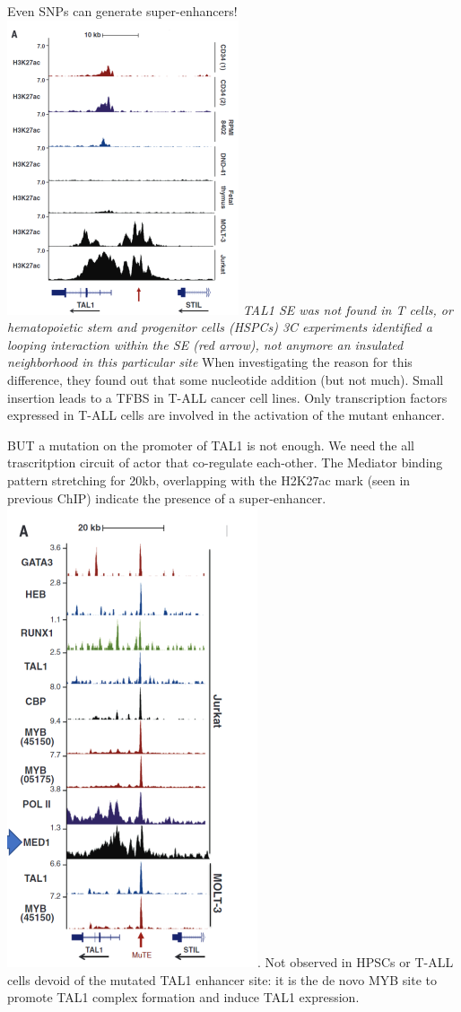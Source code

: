 Even SNPs can generate super-enhancers!
\includegraphics{../_resources/c099d4a9ad4bba13e7839f48fd831265.png}
\emph{TAL1 SE was not found in T cells, or hematopoietic stem and progenitor cells (HSPCs)
3C experiments identified a looping interaction within the SE (red arrow), not anymore an insulated neighborhood in this particular site}
When investigating the reason for this difference, they found out that some nucleotide addition (but not much). Small insertion leads to a TFBS in T-ALL cancer cell lines. Only transcription factors expressed in T-ALL cells are involved in the activation of the mutant enhancer.

BUT a mutation on the promoter of TAL1 is not enough. We need the all trascritption circuit of actor that co-regulate each-other. The Mediator binding pattern stretching for 20kb, overlapping with the H2K27ac mark (seen in previous ChIP) indicate the presence of a super-enhancer.
\includegraphics{../_resources/c55a73c929224da923f319503c218451.png}.
Not observed in HPSCs or T-ALL cells devoid of the mutated TAL1 enhancer site: it is the de novo MYB site to promote TAL1 complex formation and induce TAL1 expression.

